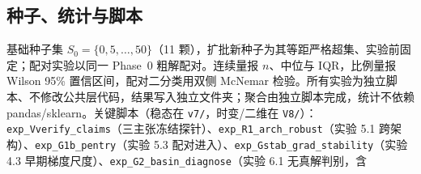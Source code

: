 \documentclass[fontset=windows,11pt]{ctexart}
\numberwithin{equation}{section}
\begin{document}
\subsection{种子、统计与脚本}
基础种子集 $S_0=\{0,5,\dots,50\}$（11 颗），扩批新种子为其等距严格超集、实验前固定；配对实验以同一 Phase~0 粗解配对。连续量报 $n$、中位与 IQR，比例量报 Wilson 95\% 置信区间，配对二分类用双侧 McNemar 检验。所有实验为独立脚本、不修改公共层代码，结果写入独立文件夹；聚合由独立脚本完成，统计不依赖 pandas/sklearn。关键脚本（稳态在 \texttt{v7/\hspace{0pt}}，时变/二维在 \texttt{V8/\hspace{0pt}}）：\texttt{exp\_\hspace{0pt}Vverify\_\hspace{0pt}claims}（三主张冻结探针）、\texttt{exp\_\hspace{0pt}R1\_\hspace{0pt}arch\_\hspace{0pt}robust}（实验 5.1 跨架构）、\texttt{exp\_\hspace{0pt}G1b\_\hspace{0pt}pentry}（实验 5.3 配对进入）、\texttt{exp\_\hspace{0pt}Gstab\_\hspace{0pt}grad\_\hspace{0pt}stability}（实验 4.3 早期梯度尺度）、\texttt{exp\_\hspace{0pt}G2\_\hspace{0pt}basin\_\hspace{0pt}diagnose}（实验 6.1 无真解判别，含 \
\end{document}
